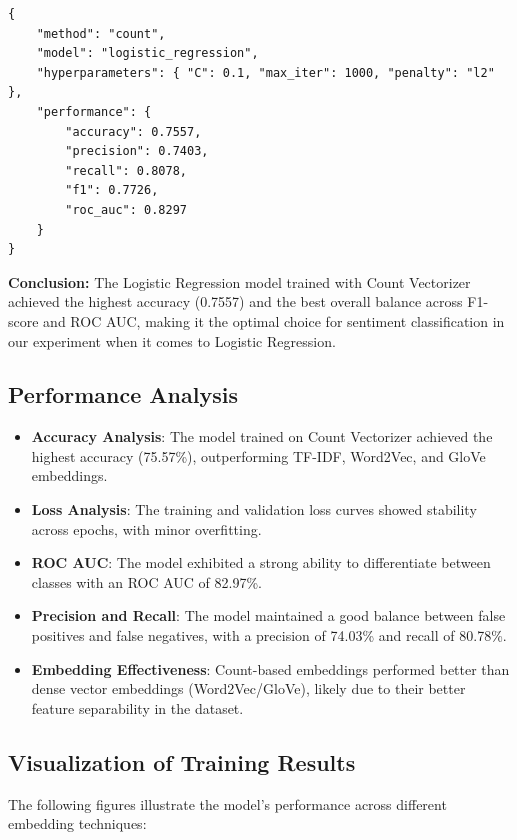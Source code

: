 \begin{verbatim}
{
    "method": "count",
    "model": "logistic_regression",
    "hyperparameters": { "C": 0.1, "max_iter": 1000, "penalty": "l2" },
    "performance": {
        "accuracy": 0.7557,
        "precision": 0.7403,
        "recall": 0.8078,
        "f1": 0.7726,
        "roc_auc": 0.8297
    }
}
\end{verbatim}

\textbf{Conclusion:} The Logistic Regression model trained with Count Vectorizer achieved the highest accuracy (0.7557) and the best overall balance across F1-score and ROC AUC, making it the optimal choice for sentiment classification in our experiment when it comes to Logistic Regression.

\subsection{Performance Analysis}
\begin{itemize}
    \item \textbf{Accuracy Analysis}: The model trained on Count Vectorizer achieved the highest accuracy (75.57\%), outperforming TF-IDF, Word2Vec, and GloVe embeddings.
    \item \textbf{Loss Analysis}: The training and validation loss curves showed stability across epochs, with minor overfitting.
    \item \textbf{ROC AUC}: The model exhibited a strong ability to differentiate between classes with an ROC AUC of 82.97\%.
    \item \textbf{Precision and Recall}: The model maintained a good balance between false positives and false negatives, with a precision of 74.03\% and recall of 80.78\%.
    \item \textbf{Embedding Effectiveness}: Count-based embeddings performed better than dense vector embeddings (Word2Vec/GloVe), likely due to their better feature separability in the dataset.
\end{itemize}

\subsection{Visualization of Training Results}
The following figures illustrate the model’s performance across different embedding techniques:

